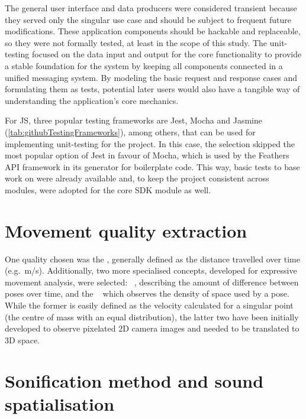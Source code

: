 The general user interface and data producers were considered transient because they served only the singular use case and should be subject to frequent future modifications.
These application components should be hackable and replaceable, so they were not formally tested, at least in the scope of this study.
The unit-testing focused on the data input and output for the core functionality to provide a stable foundation for the system by keeping all components connected in a unified messaging system.
By modeling the basic request and response cases and formulating them as tests, potential later users would also have a tangible way of understanding the application's core mechanics.

For \ac{JS}, three popular testing frameworks are Jest, Mocha and Jasmine (\ref{tab:githubTestingFrameworks}), among others, that can be used for implementing unit-testing for the project.
In this case, the selection skipped the most popular option of Jest in favour of Mocha, which is used by the Feathers \ac{API} framework in its generator for boilerplate code.
This way, basic tests to base work on were already available and, to keep the project consistent across modules, were adopted for the core \ac{SDK} module as well.



\section{Movement quality extraction}

One quality chosen was the , generally defined as the distance travelled over time (e.g.\ m/s).
Additionally, two more specialised concepts, developed for expressive movement analysis, were selected: ~\parencite[96-97]{movementQualities}, describing the amount of difference between poses over time, and the ~\parencite[97]{movementQualities} which observes the density of space used by a pose.
While the former is easily defined as the velocity calculated for a singular point (the centre of mass with an equal distribution), the latter two have been initially developed to observe pixelated \ac{2D} camera images and needed to be translated to \ac{3D} space.

\section{Sonification method and sound spatialisation}

